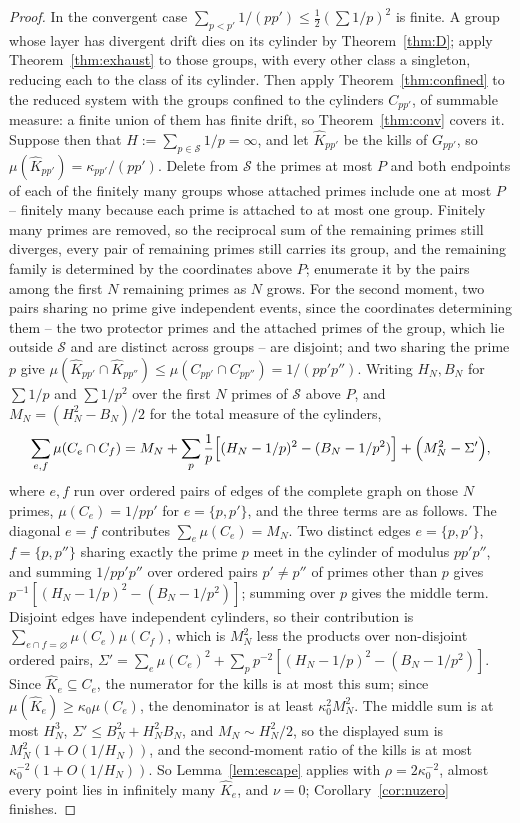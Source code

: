 \documentclass[11pt]{article}
\theoremstyle{plain}
\theoremstyle{definition}
\newcommand{\Kh}{\widehat{K}}
\begin{document}
\begin{proof}
In the convergent case $\sum_{p<p'}1/(pp')\le\frac12(\sum1/p)^2$
is finite.  A group whose layer has divergent drift dies on its
cylinder by Theorem~\ref{thm:D}; apply Theorem~\ref{thm:exhaust}
to those groups, with every other class a singleton, reducing
each to the class of its cylinder.  Then apply
Theorem~\ref{thm:confined} to the reduced system with the groups
confined to the cylinders $C_{pp'}$, of summable measure: a
finite union of them has finite drift, so Theorem~\ref{thm:conv}
covers it.
Suppose then that $H:=\sum_{p\in\mathcal{S}}1/p=\infty$, and let
$\Kh_{pp'}$ be the kills of $G_{pp'}$, so
$\mu(\Kh_{pp'})=\kappa_{pp'}/(pp')$.  Delete from $\mathcal{S}$ the primes at most $P$ and both
endpoints of each of the finitely many groups whose attached
primes include one at most $P$ -- finitely many because each
prime is attached to at most one group.  Finitely many primes
are removed, so the reciprocal sum of the remaining primes still
diverges, every pair of remaining primes still carries its
group, and the remaining family is determined by the coordinates
above $P$; enumerate it by the pairs among the first $N$
remaining primes as $N$ grows.  For
the second moment, two pairs sharing no prime give
independent events, since the coordinates determining them --
the two protector primes and the attached primes of the group,
which lie outside $\mathcal{S}$ and are distinct across groups
-- are disjoint; and two sharing the prime $p$ give
$\mu(\Kh_{pp'}\cap \Kh_{pp''})\le\mu(C_{pp'}\cap C_{pp''})
=1/(pp'p'')$.  Writing $H_N,B_N$ for $\sum1/p$ and $\sum1/p^2$
over the first $N$ primes of $\mathcal{S}$ above $P$, and
$M_N=(H_N^2-B_N)/2$ for the total measure of the cylinders,
\[
\sum_{e,f}\mu(C_e\cap C_f)=M_N+\sum_p\frac1p\Bigl[(H_N-1/p)^2-(B_N-1/p^2)\Bigr]
+\Bigl(M_N^2-\Sigma'\Bigr),
\]
where $e,f$ run over ordered pairs of edges of the complete
graph on those $N$ primes, $\mu(C_e)=1/pp'$ for $e=\{p,p'\}$,
and the three terms are as follows.  The diagonal $e=f$
contributes $\sum_e\mu(C_e)=M_N$.  Two distinct edges
$e=\{p,p'\}$, $f=\{p,p''\}$ sharing exactly the prime $p$ meet
in the cylinder of modulus $pp'p''$, and summing $1/pp'p''$ over
ordered pairs $p'\ne p''$ of primes other than $p$ gives
$p^{-1}[(H_N-1/p)^2-(B_N-1/p^2)]$; summing over $p$ gives the
middle term.  Disjoint edges have independent cylinders, so their
contribution is $\sum_{e\cap f=\varnothing}\mu(C_e)\mu(C_f)$,
which is $M_N^2$ less the products over non-disjoint ordered
pairs, $\Sigma'=\sum_e\mu(C_e)^2+\sum_pp^{-2}[(H_N-1/p)^2-(B_N-1/p^2)]$.
Since $\Kh_e\subseteq C_e$, the numerator for the kills is at
most this sum; since $\mu(\Kh_e)\ge\kappa_0\mu(C_e)$, the
denominator is at least $\kappa_0^2M_N^2$.  The middle sum is at
most $H_N^3$, $\Sigma'\le B_N^2+H_N^2B_N$, and $M_N\sim H_N^2/2$,
so the displayed sum is $M_N^2(1+O(1/H_N))$, and the
second-moment ratio of the kills is at most
$\kappa_0^{-2}(1+O(1/H_N))$.  So
Lemma~\ref{lem:escape} applies with $\rho=2\kappa_0^{-2}$, almost
every point lies in infinitely many $\Kh_e$, and $\nu=0$;
Corollary~\ref{cor:nuzero} finishes.
\end{proof}
\end{document}
